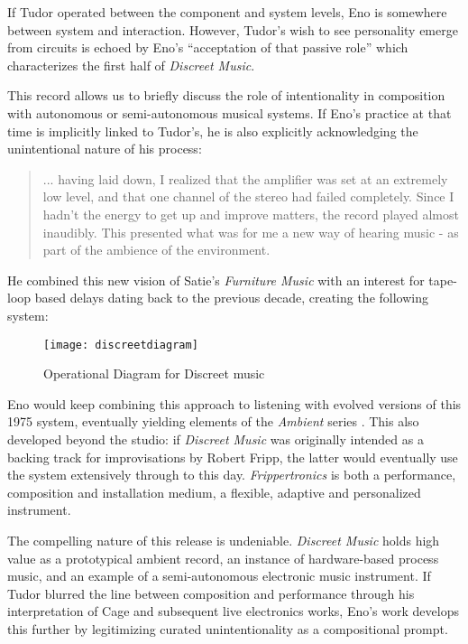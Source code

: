 If Tudor operated between the component and system levels, Eno is somewhere between system and interaction. However, Tudor's wish to see personality emerge from circuits is echoed by Eno's  ``acceptation of that passive role'' which characterizes the first half of \emph{Discreet Music}. 

This record allows us to briefly discuss the role of intentionality in composition with autonomous or semi-autonomous musical systems. If Eno's practice at that time is implicitly linked to Tudor's, he is also explicitly acknowledging the unintentional nature of his process: 

\begin{quote} ... having laid down, I realized that the amplifier was set at an extremely low level, and that one channel of the stereo had failed completely. Since I hadn't the energy to get up and improve matters, the record played almost inaudibly. This presented what was for me a new way of hearing music - as part of the ambience of the environment.
	
	\cite{eno1975}
	\end{quote}

He combined this new vision of Satie's \emph{Furniture Music} \cite{satie} with an interest for tape-loop based delays dating back to the previous decade, creating the following system: 

\begin{figure}[h!]
  \caption{Operational Diagram for Discreet music}
  \centering
    \texttt{[image: discreetdiagram]}
\end{figure}

Eno would keep combining this approach to listening with evolved versions of this 1975 system, eventually yielding elements of the \emph{Ambient} series \cite{eno1978,eno1980,eno1980b,eno1982}. This also developed beyond the studio: if \emph{Discreet Music} was originally intended as a backing track for improvisations by Robert Fripp, the latter would eventually use the system extensively through to this day. \emph{Frippertronics} is both a performance, composition and installation medium, a flexible, adaptive and personalized instrument.  

The compelling nature of this release is undeniable. \emph{Discreet Music } holds high value as a prototypical ambient record, an instance of hardware-based process music, and an example of a semi-autonomous electronic music instrument. If Tudor blurred the line between composition and performance through his interpretation of Cage and subsequent live electronics works, Eno's work develops this further by legitimizing curated unintentionality as a compositional prompt. 


